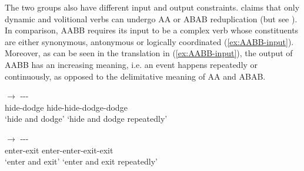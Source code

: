    
  
  \z
\z

The two groups also have different input and output constraints. \citet{Xie2020} claims that only dynamic and volitional verbs can undergo AA or ABAB reduplication (but see ).
In comparison, AABB requires its input to be a complex verb whose constituents are either synonymous, antonymous or logically coordinated (\ref{ex:AABB-input}). 
Moreover, as can be seen in the translation in (\ref{ex:AABB-input}), the output of AABB has an increasing meaning, i.e. an event happens repeatedly or continuously, as opposed to the delimitative meaning of AA and ABAB.

\ea\label{ex:AABB-input}
  \ea \gll {} $\rightarrow$ ---\\
  hide-dodge {} hide-hide-dodge-dodge\\ 
  \glt `hide and dodge' `hide and dodge repeatedly'
  
  \ex \gll {} $\rightarrow$ ---\\
  enter-exit {} enter-enter-exit-exit\\ 
  \glt `enter and exit' `enter and exit repeatedly'
  
